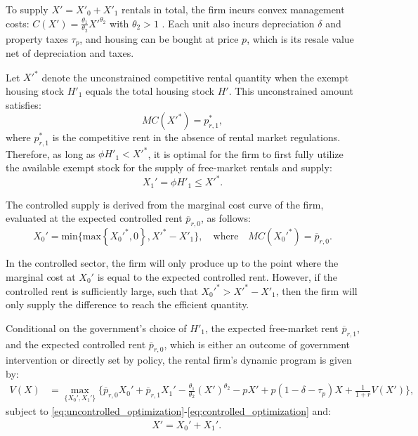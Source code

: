 \documentclass[parskip=full]{article}
\begin{document}
To supply $X'=X'_0+X'_1$ rentals in total, the firm incurs convex management costs: $C(X')=\frac{\theta_1}{\theta_2}X'^{\theta_2}$ with $\theta_2>1$ \citep{garrigaeetal-2009}. Each unit also incurs depreciation $\delta$ and property taxes $\tau_p$, and housing can be bought at price $p$, which is its resale value net of depreciation and taxes.

Let $X'^{*}$ denote the unconstrained competitive rental quantity when the exempt housing stock $H'_1$ equals the total housing stock $H'$. This unconstrained amount satisfies: \[MC(X'^{*}) = p^{*}_{r,1},\] where $p^{*}_{r,1}$ is the competitive rent in the absence of rental market regulations. Therefore, as long as $\phi H'_1<X'^{*}$, it is optimal for the firm to first fully utilize the available exempt stock for the supply of free-market rentals and supply:
\begin{equation}\label{eq:uncontrolled_optimization}
X_1'=\phi H'_1\leq X'^{*}.  
\end{equation}

The controlled supply is derived from the marginal cost curve of the firm, evaluated at the expected controlled rent $\overline{p}_{r,0}$, as follows: 
\begin{equation}\label{eq:controlled_optimization}
X_0'=\mbox{min}\{\text{max}\left\{X_0'^*,0\right\},X'^*-X'_1\}, \quad
\text{where}\quad MC(X_0'^*)=\overline{p}_{r,0}.    
\end{equation}

\noindent In the controlled sector, the firm will only produce up to the point where the marginal cost at $X_0'$ is equal to the expected controlled rent. However, if the controlled rent is sufficiently large, such that $X_0'^*>X'^*-X'_1$, then the firm will only supply the difference to reach the efficient quantity.

Conditional on the government’s choice of $H'_1$, the expected free-market rent $\overline{p}_{r,1}$, and the expected controlled rent $\overline{p}_{r,0}$, which is either an outcome of government intervention or directly set by policy, the rental firm’s dynamic program is given by:
\begin{align}\label{eq:rental_optimization}
V(X) &= \max_{\{X_0',X_1'\}} \Big\{\overline{p}_{r,0}X_0'+\overline{p}_{r,1} X_1'-\frac{\theta_1}{\theta_2}(X')^{\theta_2}-p X'+p(1-\delta-\tau_p)X+\frac{1}{1+r} V(X')\Big\},
\end{align}
\noindent subject to \eqref{eq:uncontrolled_optimization}-\eqref{eq:controlled_optimization} and:
\begin{align}
& X'=X_0'+X_1'. \label{eq:total_supply_def}
\end{align}
\end{document}
